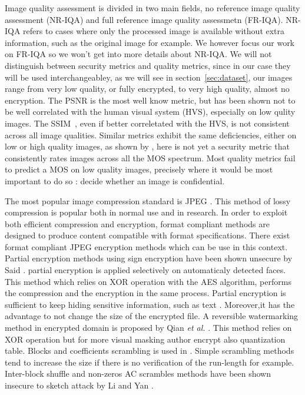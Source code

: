 \documentclass{article}
\begin{document}
Image quality assessment is divided in two main fields, no reference image quality assessment (NR-IQA) and full reference image quality assessmetn (FR-IQA). NR-IQA refers to cases where only the processed image is available without extra information, such as the original image for example. We however focus our work on FR-IQA so we won't get into more details about  NR-IQA. We will not distinguish between security metrics and quality metrics, since in our case they will be used interchangeabley, as we will see in section~\ref{sec:dataset}, our images range from very low quality, or fully encrypted, to very high quality, almost no encryption. The PSNR is the most well know metric, but has been shown not to be well correlated with the human visual system (HVS), especially on low qulity images. The SSIM~\cite{wang2004image}, even if better correletated with the HVS, is not consistent across all image qualities. Similar metrics \cite{sheikh2006image, yao2009visual, tong2010visual, sun2011objective} exhibit the same deficiencies, either on low or high quality images, as shown by \cite{hofbauer2016identifying}, here is not yet a security metric that consistently rates images across all the MOS spectrum. Most quality metrics fail to predict a MOS on low quality images, precisely where it would be most important to do so : decide whether an image is confidential.


  The most popular image compression standard is JPEG \cite{wallace1992jpeg}.  This method of lossy compression is popular both in normal use and in research. In order to exploit both efficient compression and encryption, format compliant methods are designed to produce content compatible with format specifications. There exist format compliant JPEG encryption methods which can be use in this context. Partial encryption methods using sign encryption have been shown unsecure by Said \cite{said2005measuring}. partial encryption is applied selectively on automaticaly detected faces. This method which relies on XOR operation with the AES algorithm, performs the compression and the encryption in the same process. Partial encryption is sufficient to keep hiding sensitive information, such as text \cite{pinto2013protection}. Moreover,it has the advantage to not change the size of the encrypted file. A reversible watermarking method in encrypted domain is proposed by Qian \textit{et al.} \cite{qian2014reversible}. This method relies on XOR operation but for more visual masking author encrypt also quantization table. Blocks and coefficients scrambling is used in \cite{niu2008jpeg, unterweger2012length, minemura2012jpeg, ong2015beyond}. Simple scrambling methods tend to increase the size if there is no verification of the run-length for example. Inter-block shuffle and non-zeros AC scrambles methods have been shown insecure to sketch attack by Li and Yan \cite{li2007leak}.
\end{document}
